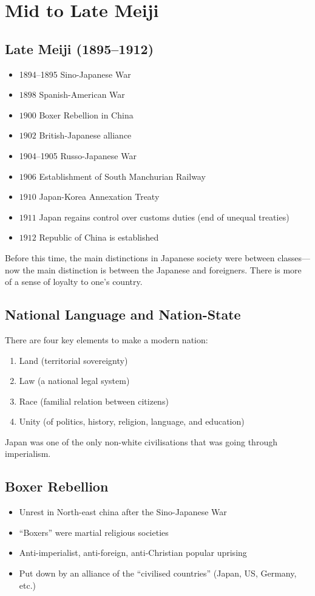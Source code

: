 \documentclass[class=article, crop=false]{standalone}
\begin{document}
  \section{Mid to Late Meiji}
  \subsection{Late Meiji (1895--1912)}
  \begin{itemize}
    \item 1894--1895 Sino-Japanese War
    \item $1898$ Spanish-American War
    \item $1900$ Boxer Rebellion in China
    \item $1902$ British-Japanese alliance
    \item 1904--1905 Russo-Japanese War
    \item $1906$ Establishment of South Manchurian Railway
    \item $1910$ Japan-Korea Annexation Treaty
    \item $1911$ Japan regains control over customs duties (end of unequal treaties)
    \item $1912$ Republic of China is established
  \end{itemize}
  \begin{note}{}
    Before this time, the main distinctions in Japanese society were between classes---now the main distinction is between the Japanese and foreigners. There is more of a sense of loyalty to one's country.
  \end{note}
  \subsection{National Language and Nation-State}
  There are four key elements to make a modern nation:
  \begin{enumerate}
    \item Land (territorial sovereignty)
    \item Law (a national legal system)
    \item Race (familial relation between citizens)
    \item Unity (of politics, history, religion, language, and education)
  \end{enumerate}
  \begin{note}{}
    Japan was one of the only non-white civilisations that was going through imperialism.
  \end{note}
  \subsection{Boxer Rebellion}
  \begin{itemize}
    \item Unrest in North-east china after the Sino-Japanese War
    \item ``Boxers'' were martial religious societies
    \item Anti-imperialist, anti-foreign, anti-Christian popular uprising
    \item Put down by an alliance of the ``civilised countries'' (Japan, US, Germany, etc.)
  \end{itemize}
\end{document}
